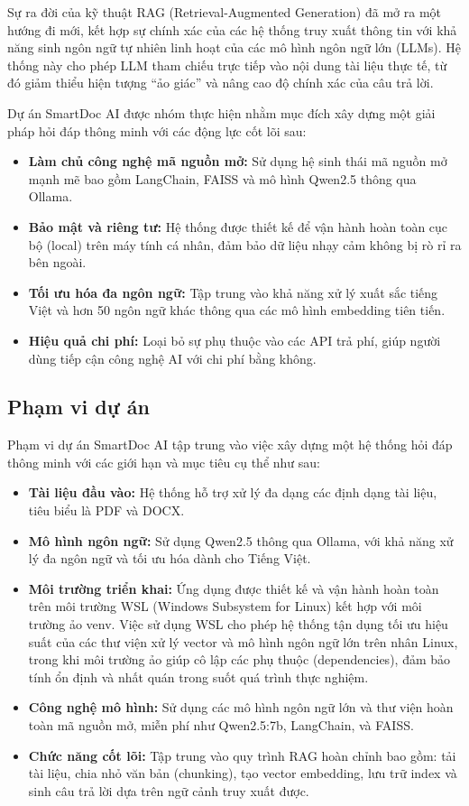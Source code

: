 \documentclass[conference]{IEEEtran}
\begin{document}
Sự ra đời của kỹ thuật RAG (Retrieval-Augmented Generation) đã mở ra một hướng đi mới, kết hợp sự chính xác của các hệ thống truy xuất thông tin với khả năng sinh ngôn ngữ tự nhiên linh hoạt của các mô hình ngôn ngữ lớn (LLMs). Hệ thống này cho phép LLM tham chiếu trực tiếp vào nội dung tài liệu thực tế, từ đó giảm thiểu hiện tượng ``ảo giác'' và nâng cao độ chính xác của câu trả lời.

Dự án SmartDoc AI được nhóm thực hiện nhằm mục đích xây dựng một giải pháp hỏi đáp thông minh với các động lực cốt lõi sau:
\begin{itemize}
  \item \textbf{Làm chủ công nghệ mã nguồn mở:} Sử dụng hệ sinh thái mã nguồn mở mạnh mẽ bao gồm LangChain, FAISS và mô hình Qwen2.5 thông qua Ollama.
  \item \textbf{Bảo mật và riêng tư:} Hệ thống được thiết kế để vận hành hoàn toàn cục bộ (local) trên máy tính cá nhân, đảm bảo dữ liệu nhạy cảm không bị rò rỉ ra bên ngoài.
  \item \textbf{Tối ưu hóa đa ngôn ngữ:} Tập trung vào khả năng xử lý xuất sắc tiếng Việt và hơn 50 ngôn ngữ khác thông qua các mô hình embedding tiên tiến.
  \item \textbf{Hiệu quả chi phí:} Loại bỏ sự phụ thuộc vào các API trả phí, giúp người dùng tiếp cận công nghệ AI với chi phí bằng không.
\end{itemize}

\subsection{Phạm vi dự án}

Phạm vi dự án SmartDoc AI tập trung vào việc xây dựng một hệ thống hỏi đáp thông minh với các giới hạn và mục tiêu cụ thể như sau:
\begin{itemize}
  \item \textbf{Tài liệu đầu vào:} Hệ thống hỗ trợ xử lý đa dạng các định dạng tài liệu, tiêu biểu là PDF và DOCX.
  \item \textbf{Mô hình ngôn ngữ:} Sử dụng Qwen2.5 thông qua Ollama, với khả năng xử lý đa ngôn ngữ và tối ưu hóa dành cho Tiếng Việt.
  \item \textbf{Môi trường triển khai:} Ứng dụng được thiết kế và vận hành hoàn toàn trên môi trường WSL (Windows Subsystem for Linux) kết hợp với môi trường ảo venv. Việc sử dụng WSL cho phép hệ thống tận dụng tối ưu hiệu suất của các thư viện xử lý vector và mô hình ngôn ngữ lớn trên nhân Linux, trong khi môi trường ảo giúp cô lập các phụ thuộc (dependencies), đảm bảo tính ổn định và nhất quán trong suốt quá trình thực nghiệm.
  \item \textbf{Công nghệ mô hình:} Sử dụng các mô hình ngôn ngữ lớn và thư viện hoàn toàn mã nguồn mở, miễn phí như Qwen2.5:7b, LangChain, và FAISS.
  \item \textbf{Chức năng cốt lõi:} Tập trung vào quy trình RAG hoàn chỉnh bao gồm: tải tài liệu, chia nhỏ văn bản (chunking), tạo vector embedding, lưu trữ index và sinh câu trả lời dựa trên ngữ cảnh truy xuất được.
\end{itemize}
\end{document}
